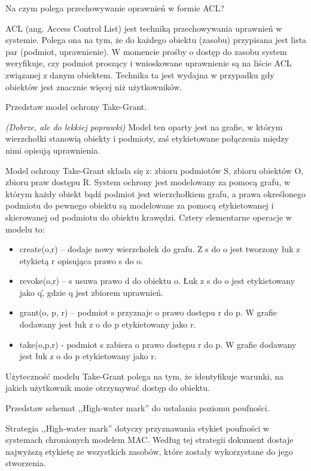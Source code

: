 \documentclass[answers,11pt]{exam}
\newcommand{\fixit}{\textit{(Dobrze, ale do lekkiej poprawki)} }
\begin{document}
\begin{questions}
\question Na czym polega przechowywanie oprawnień w formie ACL?
\begin{solution}
ACL (ang. Access Control List) jest techniką przechowywania uprawnień w systemie. Polega ona na tym, że do każdego obiektu (zasobu) przypisana jest lista par (podmiot, uprawnienie). W momencie prośby o dostęp do zasobu system weryfikuje, czy podmiot proszący i wnioskowane uprawnienie są na liście ACL związanej z danym obiektem. Technika ta jest wydajna w przypadku gdy obiektów jest znacznie więcej niż użytkowników.
\end{solution}

\question Przedstaw model ochrony Take-Grant.
\begin{solution}
\fixit
Model ten oparty jest na grafie, w którym wierzchołki stanowią obiekty i podmioty, zaś etykietowane połączenia między nimi opisują uprawnienia.

Model ochrony Take-Grant składa się z: zbioru podmiotów S, zbioru obiektów O, zbioru praw dostępu R. System ochrony jest modelowany za pomocą grafu, w którym każdy obiekt bądź podmiot jest wierzchołkiem grafu, a prawa określonego podmiotu do pewnego obiektu są modelowane za pomocą etykietowanej i skierowanej od podmiotu do obiektu krawędzi. Cztery elementarne operacje w modelu to:
\begin{itemize}
\item create(o,r) – dodaje nowy wierzchołek do grafu. Z s do o jest tworzony łuk z etykietą r opisująca prawo s do o.
\item revoke(o,r) – s usuwa prawo d do obiektu o. Łuk z s do o jest etykietowany jako q\r, gdzie q jest zbiorem uprawnień.
\item grant(o, p, r) – podmiot s przyznaje o prawo dostępu r do p. W grafie dodawany jest łuk z o do p etykietowany jako r.
\item take(o,p,r) -  podmiot s zabiera o prawo dostępu r do p. W grafie dodawany jest łuk z o do p etykietowany jako r.
\end{itemize}
Użyteczność modelu Take-Grant polega na tym, że identyfikuje warunki, na jakich użytkownik może otrzymywać dostęp do obiektu.

\end{solution}

\question Przedstaw schemat ,,High-water mark'' do ustalania poziomu poufności.
\begin{solution}
Strategia ,,High-water mark'' dotyczy przyznawania etykiet poufności w systemach chronionych modelem MAC. Według tej strategii dokument dostaje najwyższą etykietę ze wszystkich zasobów, które zostały wykorzystane do jego stworzenia.
\end{solution}


\end{questions}
\end{document}
